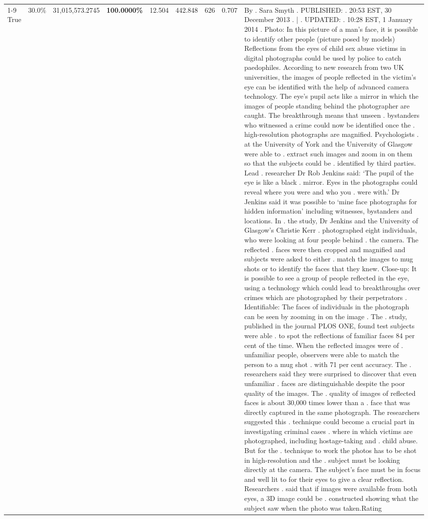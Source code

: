 \begin{table}[H]
\begin{tabular}{lllrlllll}
\cline{1-9}
True & 30.0\% & 31,015,573.2745 & \bfseries \color{red} 100.0000\% & 12.504 & 442.848 & 626 & 0.707 & By . Sara Smyth . PUBLISHED: . 20:53 EST, 30 December 2013 . | . UPDATED: . 10:28 EST, 1 January 2014 . Photo: In this picture of a man's face, it is possible to identify other people (picture posed by models) Reflections from the eyes of child sex abuse victims in digital photographs could be used by police to catch paedophiles. According to new research from two UK universities, the images of people reflected in the victim's eye can be identified with the help of advanced camera technology. The eye's pupil acts like a mirror in which the images of people standing behind the photographer are caught. The breakthrough means that unseen . bystanders who witnessed a crime could now be identified once the . high-resolution photographs are magnified. Psychologists . at the University of York and the University of Glasgow were able to . extract such images and zoom in on them so that the subjects could be . identified by third parties. Lead . researcher Dr Rob Jenkins said: ‘The pupil of the eye is like a black . mirror. Eyes in the photographs could reveal where you were and who you . were with.' Dr Jenkins said it was possible to ‘mine face photographs for hidden information' including witnesses, bystanders and locations. In . the study, Dr Jenkins and the University of Glasgow's Christie Kerr . photographed eight individuals, who were looking at four people behind . the camera. The reflected . faces were then cropped and magnified and subjects were asked to either . match the images to mug shots or to identify the faces that they knew. Close-up: It is possible to see a group of people reflected in the eye, using a technology which could lead to breakthroughs over crimes which are photographed by their perpetrators . Identifiable: The faces of individuals in the photograph can be seen by zooming in on the image . The . study, published in the journal PLOS ONE, found test subjects were able . to spot the reflections of familiar faces 84 per cent of the time. When the reflected images were of . unfamiliar people, observers were able to match the person to a mug shot . with 71 per cent accuracy. The . researchers said they were surprised to discover that even unfamiliar . faces are distinguishable despite the poor quality of the images. The . quality of images of reflected faces is about 30,000 times lower than a . face that was directly captured in the same photograph. The researchers suggested this . technique could become a crucial part in investigating criminal cases . where in which victims are photographed, including hostage-taking and . child abuse. But for the . technique to work the photos has to be shot in high-resolution and the . subject must be looking directly at the camera. The subject's face must be in focus and well lit to for their eyes to give a clear reflection. Researchers . said that if images were available from both eyes, a 3D image could be . constructed showing what the subject saw when the photo was taken.Rating \\

\end{tabular}
\end{table}
